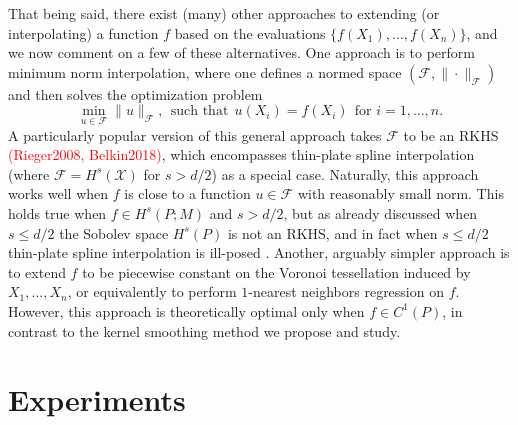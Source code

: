 \documentclass{article}
\newcommand{\Reals}{\mathbb{R}}
\newcommand{\1}{\mathbf{1}}
\newcommand{\mc}[1]{\mathcal{#1}}
\theoremstyle{alden}
\theoremstyle{aldenthm}
\theoremstyle{definition}
\theoremstyle{remark}
\begin{document}
\begin{itemize}
	That being said, there exist (many) other approaches to extending (or interpolating) a function $f$ based on the evaluations $\{f(X_1),\ldots,f(X_n)\}$, and we now comment on a few of these alternatives. One approach is to perform minimum norm interpolation, where one defines a normed space $(\mc{F},\|\cdot\|_{\mc{F}})$ and then solves the optimization problem
	\begin{equation*}
	\min_{u \in \mc{F}} \|u\|_{\mc{F}},~~\textrm{such that}~~ u(X_i) =  f(X_i)~~\textrm{for $i = 1,\ldots,n$.}
	\end{equation*}
	A particularly popular version of this general approach takes $\mc{F}$ to be an RKHS \textcolor{red}{(Rieger2008, Belkin2018)}, which encompasses thin-plate spline interpolation (where $\mc{F} = H^s(\mc{X})$ for $s > d/2$) as a special case. Naturally, this approach works well when $f$ is close to a function $u \in \mc{F}$ with reasonably small norm.  This holds true when $f \in H^s(P;M)$ and $s > d/2$, but as already discussed when $s \leq d/2$ the Sobolev space $H^s(P)$ is not an RKHS, and in fact when $s \leq d/2$ thin-plate spline interpolation is ill-posed \citep{green93}. Another, arguably simpler approach is to extend $f$ to be piecewise constant on the Voronoi tessellation induced by $X_1,\ldots,X_n$, or equivalently to perform $1$-nearest neighbors regression on $f$. However, this approach is theoretically optimal only when $f \in C^1(P)$, in contrast to the kernel smoothing method we propose and study.
\end{itemize}

\section{Experiments}
\label{sec:experiments}
\end{document}

